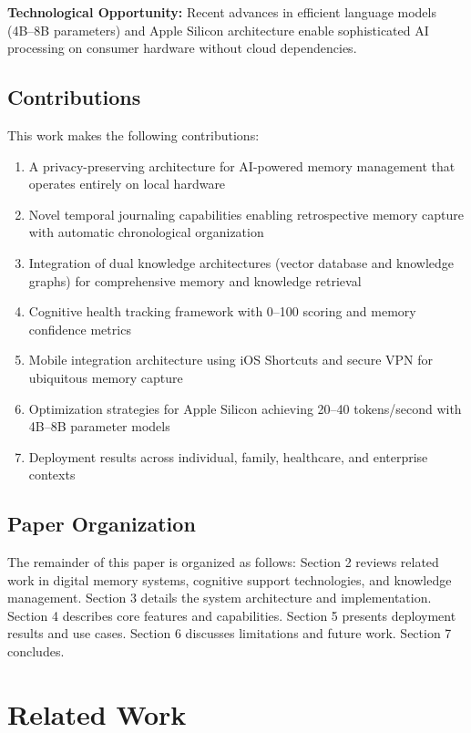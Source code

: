 \documentclass[11pt,letterpaper]{article}
\begin{document}
\textbf{Technological Opportunity:} Recent advances in efficient language models (4B--8B parameters) and Apple Silicon architecture enable sophisticated AI processing on consumer hardware without cloud dependencies.

\subsection{Contributions}

This work makes the following contributions:

\begin{enumerate}
\item A privacy-preserving architecture for AI-powered memory management that operates entirely on local hardware
\item Novel temporal journaling capabilities enabling retrospective memory capture with automatic chronological organization
\item Integration of dual knowledge architectures (vector database and knowledge graphs) for comprehensive memory and knowledge retrieval
\item Cognitive health tracking framework with 0--100 scoring and memory confidence metrics
\item Mobile integration architecture using iOS Shortcuts and secure VPN for ubiquitous memory capture
\item Optimization strategies for Apple Silicon achieving 20--40 tokens/second with 4B--8B parameter models
\item Deployment results across individual, family, healthcare, and enterprise contexts
\end{enumerate}

\subsection{Paper Organization}

The remainder of this paper is organized as follows: Section 2 reviews related work in digital memory systems, cognitive support technologies, and knowledge management. Section 3 details the system architecture and implementation. Section 4 describes core features and capabilities. Section 5 presents deployment results and use cases. Section 6 discusses limitations and future work. Section 7 concludes.

\section{Related Work}
\end{document}
